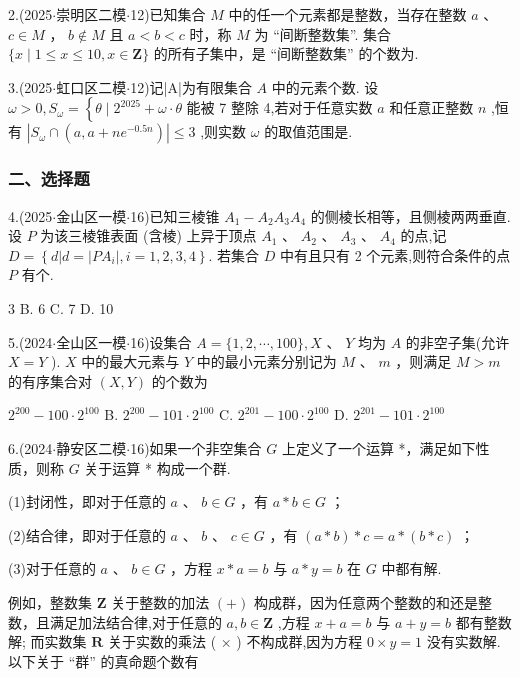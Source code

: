 2.(2025$\cdot$崇明区二模$\cdot$12)已知集合 $M$ 中的任一个元素都是整数，当存在整数 $a$ 、 $c \in  M$ ， $b \notin  M$ 且 $a < b < c$ 时，称 $M$ 为 “间断整数集”. 集合 $\{ x \mid  1 \leq  x \leq  {10},x \in  \mathbf{Z}\}$ 的所有子集中，是 “间断整数集” 的个数为\blkda[2]{}.

3.(2025$\cdot$虹口区二模$\cdot$12)记|A|为有限集合 $A$ 中的元素个数. 设 $\omega  > 0,{S}_{\omega } = \left\{  {\theta  \mid  {2}^{2025} + \omega  \cdot  \theta }\right.$ 能被 7 整除 4,若对于任意实数 $a$ 和任意正整数 $n$ ,恒有 $\left| {{S}_{\omega } \cap  \left( {a,a + n{{e}}^{-{0.5n}}}\right) }\right|  \leq  3$ ,则实数 $\omega$ 的取值范围是\blkda[2]{}.

\subsubsection*{二、选择题}

4.(2025$\cdot$金山区一模$\cdot$16)已知三棱锥 ${A}_{1} - {A}_{2}{A}_{3}{A}_{4}$ 的侧棱长相等，且侧棱两两垂直. 设 $P$ 为该三棱锥表面 (含棱) 上异于顶点 ${A}_{1}$ 、 ${A}_{2}$ 、 ${A}_{3}$ 、 ${A}_{4}$ 的点,记 $D = \left\{  {d\left| {d = }\right| P{A}_{i}\mid ,i = 1,2,3,4}\right\}$. 若集合 $D$ 中有且只有 2 个元素,则符合条件的点 $P$ 有\blkda[2]{}个. \dotfill{(\kh{})}

\xx{}{}{}{}3 B. 6 C. 7 D. 10

5.(2024$\cdot$全山区一模$\cdot$16)设集合 $A = \{ 1,2,\cdots ,{100}\} ,X$ 、 $Y$ 均为 $A$ 的非空子集(允许 $X = Y$ ). $X$ 中的最大元素与 $Y$ 中的最小元素分别记为 $M$ 、 $m$ ，则满足 $M > m$ 的有序集合对 $\left( {X,Y}\right)$ 的个数为

\dotfill{(\kh{})}

\xx{}{}{}{}${2}^{200} - {100} \cdot  {2}^{100}$ B. ${2}^{200} - {101} \cdot  {2}^{100}$ C. ${2}^{201} - {100} \cdot  {2}^{100}$ D. ${2}^{201} - {101} \cdot  {2}^{100}$

6.(2024$\cdot$静安区二模$\cdot$16)如果一个非空集合 $G$ 上定义了一个运算 *，满足如下性质，则称 $G$ 关于运算 * 构成一个群.

(1)封闭性，即对于任意的 $a$ 、 $b \in  G$ ，有 $a * b \in  G$ ；

(2)结合律，即对于任意的 $a$ 、 $b$ 、 $c \in  G$ ，有 $\left( {a * b}\right)  * c = a * \left( {b * c}\right)$ ；

(3)对于任意的 $a$ 、 $b \in  G$ ，方程 $x * a = b$ 与 $a * y = b$ 在 $G$ 中都有解.

例如，整数集 $\mathbf{Z}$ 关于整数的加法 $\left( +\right)$ 构成群，因为任意两个整数的和还是整数，且满足加法结合律,对于任意的 $a,b \in  \mathbf{Z}$ ,方程 $x + a = b$ 与 $a + y = b$ 都有整数解; 而实数集 $\mathbf{R}$ 关于实数的乘法 ( $\times$ ) 不构成群,因为方程 $0 \times  y = 1$ 没有实数解. 以下关于 “群” 的真命题个数有 \dotfill{(\kh{})}

